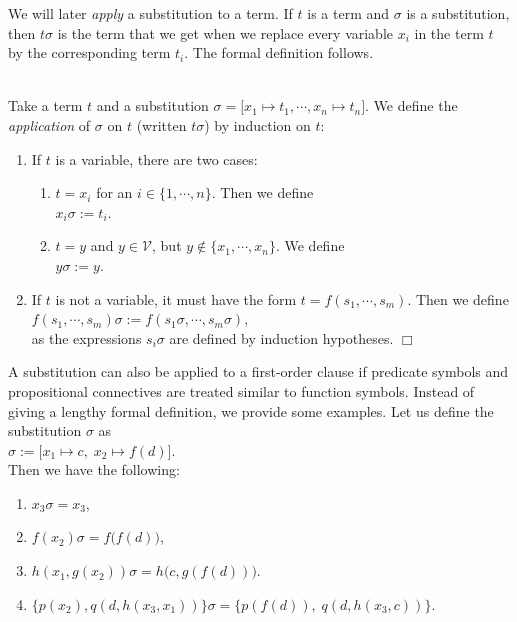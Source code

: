 \noindent
We will later \emph{apply} a substitution to a term.  If  $t$ is a term and  
$\sigma$ is a substitution, then $t\sigma$ is the term that we get when we replace every
variable $x_i$ in the term $t$ by the corresponding term  $t_i$.  The formal definition
follows.

\begin{Definition}
\hspace*{\fill} \\
Take a term $t$ and a substitution $\sigma = \bigl[ x_1 \mapsto t_1, \cdots, x_n \mapsto t_n \bigr]$.
We define the  \emph{application} of $\sigma$ on $t$ (written $t\sigma$) by induction on  $t$: 
\begin{enumerate}
\item If  $t$ is a variable, there are two cases:
  \begin{enumerate}
  \item $t = x_i$ for an $i\in\{1,\cdots,n\}$.  Then we define
        \\[0.2cm]
        \hspace*{1.3cm}
        $x_i\sigma := t_i$.
  \item $t = y$ and $y\in\mathcal{V}$, but $y \not\in \{x_1,\cdots,x_n\}$.  We define
        \\[0.2cm]
        \hspace*{1.3cm}
        $y\sigma := y$.
  \end{enumerate}
\item If $t$ is not a variable, it must have the form  $t= f(s_1,\cdots,s_m)$. Then we
      define 
      \\[0.2cm]
      \hspace*{1.3cm} 
      $f(s_1, \cdots, s_m)\sigma := f(s_1\sigma, \cdots, s_m\sigma)$, 
      \\[0.2cm]
      as the expressions  $s_i\sigma$ are defined by induction hypotheses.      
      \hspace*{\fill} $\Box$
\end{enumerate}
\end{Definition}

A substitution can also be applied to a first-order clause if predicate symbols and 
propositional connectives are treated similar to function symbols.  Instead of giving a
lengthy formal definition, we provide some examples.
Let us define the substitution $\sigma$ as
\\[0.2cm]
\hspace*{1.3cm} $\sigma := \big[ x_1 \mapsto c,\; x_2 \mapsto f(d) \big]$. \\[0.2cm]
Then we have the following:
\begin{enumerate}
\item $x_3\sigma = x_3$,
\item $f(x_2)\sigma = f\bigl(f(d)\bigr)$,
\item $h(x_1,g(x_2))\sigma = h\bigl(c,g(f(d))\bigr)$.
\item $\bigl\{ p(x_2), q(d,h(x_3,x_1))\bigr\}\sigma = \bigl\{ p(f(d)),\; q(d,h(x_3,c))\bigr\}$.
\end{enumerate}


